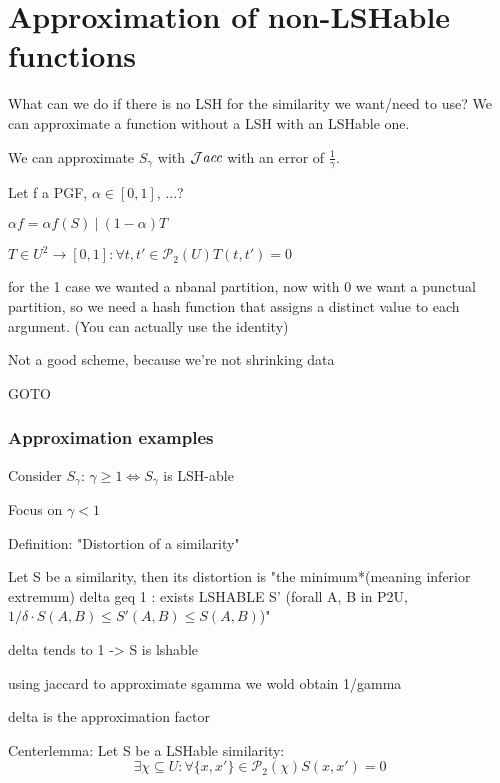 	
	
	
\section{Approximation of non-LSHable functions}

	What can we do if there is no LSH for the similarity we want/need to use? We can approximate a function without a LSH with an LSHable one.
	
	\ex We can approximate $S_\gamma$ with $\mathcal{J}\textit{acc}$ with an error of $\frac{1}{\gamma}$.
	
	Let f a PGF, $\alpha \in [0, 1]$, ...?
	
	$\alpha f = \alpha f(S)\ |\ (1 - \alpha)T$
	
	$T \in U^2 \to [0, 1] : \forall {t, t'} \in \mathcal{P}_2(U) T(t, t') = 0$
	
	for the 1 case we wanted a nbanal partition, now with 0 we want a punctual partition, so we need a hash function that assigns a distinct value to each argument. (You can actually use the identity)
	
	Not a good scheme, because we're not shrinking data
	
	GOTO %
	
\subsubsection{Approximation examples}
	
	Consider $S_\gamma$: $\gamma \geq 1 \Leftrightarrow S_\gamma$ is LSH-able
	
	Focus on $\gamma < 1$
	
	Definition: "Distortion of a similarity"
	
	Let S be a similarity, then its distortion is "the minimum*(meaning inferior extremum) delta geq 1 : exists LSHABLE S' (forall {A, B} in P2U, $1/\delta \cdot S(A, B) \leq S'(A, B) \leq S(A, B)$)"
	
	delta tends to 1 -> S is lshable
	
	using jaccard to approximate sgamma we wold obtain 1/gamma
	
	delta is the approximation factor
	
	
	Centerlemma: Let S be a LSHable similarity:
	\[
		\exists \chi \subseteq U : \forall \{x, x'\} \in \mathcal{P}_2(\chi) S(x, x')=0
	\]

